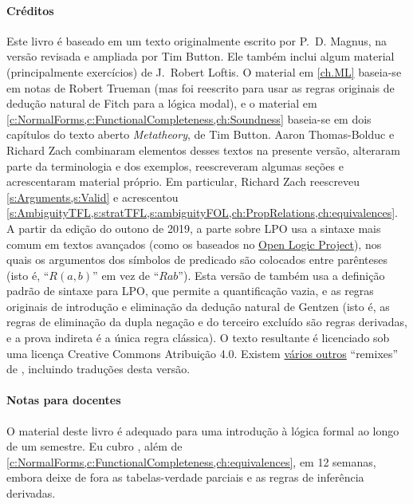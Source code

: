\paragraph{Créditos} Este livro é baseado em um texto originalmente escrito por
P.~D. Magnus, na versão revisada e ampliada por Tim Button. Ele
também inclui algum material (principalmente exercícios) de J.~Robert Loftis.
O material em \cref{ch.ML} baseia-se em notas de Robert Trueman (mas foi
reescrito para usar as regras originais de dedução natural de Fitch para a
lógica modal), e o material em
\cref{c:NormalForms,c:FunctionalCompleteness,ch:Soundness} baseia-se em dois
capítulos do texto aberto \textit{Metatheory}, de Tim Button. Aaron
Thomas-Bolduc e Richard Zach combinaram elementos desses textos
na presente versão, alteraram parte da terminologia e dos
exemplos, reescreveram algumas seções e acrescentaram material próprio. Em
particular, Richard Zach reescreveu \cref{s:Arguments,s:Valid} e acrescentou
\cref{s:AmbiguityTFL,s:stratTFL,s:ambiguityFOL,ch:PropRelations,ch:equivalences}.
A partir da edição do outono de 2019, a parte sobre LPO usa a sintaxe mais
comum em textos avançados (como os baseados no
\href{https://openlogicproject.org/}{Open Logic Project}), nos quais os
argumentos dos símbolos de predicado são colocados entre parênteses (isto é,
\textquotedblleft $R(a,b)$\textquotedblright{} em vez de \textquotedblleft $Rab$\textquotedblright{}). Esta versão de \forallx{} também usa a
definição padrão de sintaxe para LPO, que permite a quantificação vazia, e as
regras originais de introdução e eliminação da dedução natural de Gentzen (isto
é, as regras de eliminação da dupla negação e do terceiro excluído são regras
derivadas, e a prova indireta é a única regra clássica). O texto resultante é
licenciado sob uma licença Creative Commons Atribuição 4.0. Existem
\href{https://github.com/OpenLogicProject/OpenLogic/wiki/Other-Logic-Textbooks}{vários
outros} \textquotedblleft remixes\textquotedblright{} de \forallx, incluindo traduções desta versão.

\paragraph{Notas para docentes} O material deste livro é adequado para uma introdução à lógica formal ao longo de um semestre. Eu cubro , além de \cref{c:NormalForms,c:FunctionalCompleteness,ch:equivalences}, em 12 semanas, embora deixe de fora as tabelas-verdade parciais e as regras de inferência derivadas.

